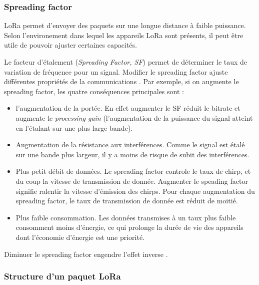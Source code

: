 \subsubsection{Spreading factor}

LoRa permet d'envoyer des paquets sur une longue distance à faible puissance. Selon l'environement dans lequel les appareils LoRa sont présents, il peut être utile de pouvoir ajuster certaines capacités.

\vspace{0.1cm}

Le facteur d'étalement (\textit{Spreading Factor, SF}) permet de déterminer le taux de variation de fréquence pour un signal. Modifier le spreading factor ajuste différentes propriétés de la communications \cite{thethingsnetworkSF}. Par exemple, si on augmente le spreading factor, les quatre conséquences principales sont :

\vspace{0.1cm}

\begin{itemize}
\item l'augmentation de la portée. En effet augmenter le SF réduit le bitrate et augmente le \textit{processing gain} (l'augmentation de la puissance du signal atteint en l'étalant sur une plus large bande).
\item Augmentation de la résistance aux interférences. Comme le signal est étalé sur une bande plus largeur, il y a moins de risque de subit des interférences.
\item Plus petit débit de données. Le spreading factor controle le taux de chirp, et du coup la vitesse de transmission de donnée. Augmenter le speading factor signifie ralentir la vitesse d'émission des chirps. Pour chaque augmentation du spreading factor, le taux de transmission de donnée est réduit de moitié.
\item Plus faible consommation. Les données transmises à un taux plus faible consomment moins d'énergie, ce qui prolonge la durée de vie des appareils dont l'économie d'énergie est une priorité.
\end{itemize}

Diminuer le spreading factor engendre l'effet inverse \cite{thethingsnetworkSF}.

\newpage

\subsubsection{Structure d'un paquet LoRa}

